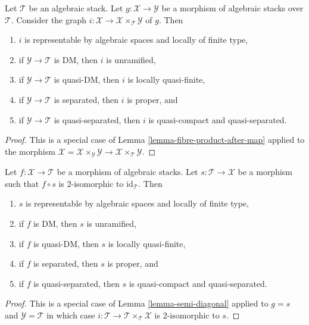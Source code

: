\begin{lemma}
\label{lemma-semi-diagonal}
Let $\mathcal{T}$ be an algebraic stack. Let $g : \mathcal{X} \to \mathcal{Y}$
be a morphism of algebraic stacks over $\mathcal{T}$. Consider the graph
$i : \mathcal{X} \to \mathcal{X} \times_\mathcal{T} \mathcal{Y}$ of $g$. Then
\begin{enumerate}
\item $i$ is representable by algebraic spaces and locally of finite type,
\item if $\mathcal{Y} \to \mathcal{T}$ is DM, then $i$ is unramified,
\item if $\mathcal{Y} \to \mathcal{T}$ is quasi-DM, then $i$ is locally
quasi-finite,
\item if $\mathcal{Y} \to \mathcal{T}$ is separated, then $i$ is proper, and
\item if $\mathcal{Y} \to \mathcal{T}$ is quasi-separated, then $i$ is
quasi-compact and quasi-separated.
\end{enumerate}
\end{lemma}

\begin{proof}
This is a special case of Lemma \ref{lemma-fibre-product-after-map}
applied to the morphism
$\mathcal{X} = \mathcal{X} \times_\mathcal{Y} \mathcal{Y} \to
\mathcal{X} \times_\mathcal{T} \mathcal{Y}$.
\end{proof}

\begin{lemma}
\label{lemma-section-immersion}
Let $f : \mathcal{X} \to \mathcal{T}$ be a morphism of algebraic stacks.
Let $s : \mathcal{T} \to \mathcal{X}$ be a morphism such that
$f \circ s$ is $2$-isomorphic to $\text{id}_\mathcal{T}$. Then
\begin{enumerate}
\item $s$ is representable by algebraic spaces and locally of finite type,
\item if $f$ is DM, then $s$ is unramified,
\item if $f$ is quasi-DM, then $s$ is locally quasi-finite,
\item if $f$ is separated, then $s$ is proper, and
\item if $f$ is quasi-separated, then $s$ is quasi-compact and quasi-separated.
\end{enumerate}
\end{lemma}

\begin{proof}
This is a special case of Lemma \ref{lemma-semi-diagonal} applied to
$g = s$ and $\mathcal{Y} = \mathcal{T}$ in which case
$i : \mathcal{T} \to \mathcal{T} \times_\mathcal{T} \mathcal{X}$
is $2$-isomorphic to $s$.
\end{proof}

